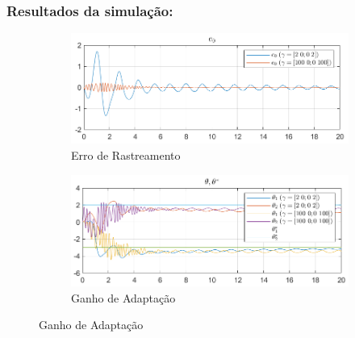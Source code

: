 \documentclass[10pt]{article}
\begin{document}
\subsubsection{Resultados da simulação:}

\begin{figure}[h!]
    \centering
    \begin{subfigure}[b]{0.35\textwidth}
        \centering
        \includegraphics[width=\textwidth]{img/fig08a.png}
        \caption{Erro de Rastreamento}
    \end{subfigure}
    \begin{subfigure}[b]{0.35\textwidth}
        \centering
        \includegraphics[width=\textwidth]{img/fig08b.png}
        \caption{Ganho de Adaptação}
    \end{subfigure}


\end{figure}
\end{document}
